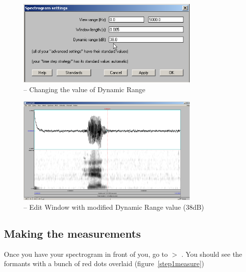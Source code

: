 \begin{figure}[!tbp]
\caption{\Praat{} -- Changing the value of Dynamic Range}
\label{step4look}
	\begin{center}
		\includegraphics[width=0.8\textwidth]{./figures/PraatEditWindowSpectroSettingsDynRange}
	\end{center}
\end{figure}

\begin{figure}[!tbp]
\caption{\Praat{} -- Edit Window with modified Dynamic Range value (38dB)}
\label{step5look}
	\begin{center}
		\includegraphics[width=0.8\textwidth]{./figures/PraatEditWindowPretty41dB}
	\end{center}
\end{figure}

\subsection{Making the measurements}

Once you have your spectrogram in front of you, go to  $>$ . You should see the formants with a bunch of red dots overlaid (figure~\ref{step1measure})

